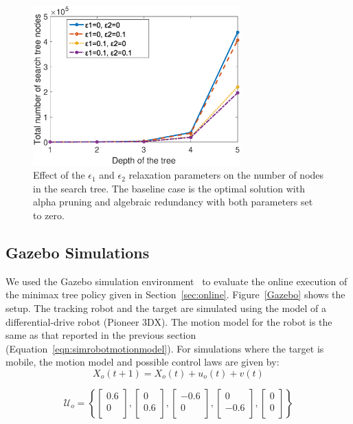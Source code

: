 \documentclass[journal]{IEEEtran}
\begin{document}
\begin{figure}[!htb]
  \centering
  \includegraphics[width=8cm]{figs/Number_of_nodes_with_pruning.eps}
  \caption{Effect of the $\epsilon_1$ and $\epsilon_2$ relaxation parameters on the number of nodes in the search tree. The baseline case is the optimal solution with alpha pruning and algebraic redundancy with both parameters set to zero.}
  \label{Number_of_nodes_with_pruning}
\end{figure}
  

\subsection{Gazebo Simulations}

We used the Gazebo simulation environment~\cite{koenig2004design} to evaluate the online execution of the minimax tree policy given in Section~\ref{sec:online}. Figure~\ref{Gazebo} shows the setup. The tracking robot and the target are simulated using the model of a differential-drive robot (Pioneer 3DX). The motion model for the robot is the same as that reported in the previous section (Equation~\ref{eqn:simrobotmotionmodel}). For simulations where the target is mobile, the motion model and possible control laws are given by:
 $$ X_o(t+1)=X_o(t)+u_o(t)+v(t)$$

\begin{equation}
\mathcal{U}_o= \left\{\begin{bmatrix}
    0.6    \\
   0   \\
\end{bmatrix}, \begin{bmatrix}
    0    \\
   0.6   \\
\end{bmatrix}, \begin{bmatrix}
    -0.6    \\
   0   \\
\end{bmatrix}, \begin{bmatrix}
    0    \\
   -0.6   \\
\end{bmatrix}, \begin{bmatrix}
    0    \\
   0   \\
\end{bmatrix}\right\}
\label{eqn:simtargetmotionmodel}
\end{equation}
\end{document}
